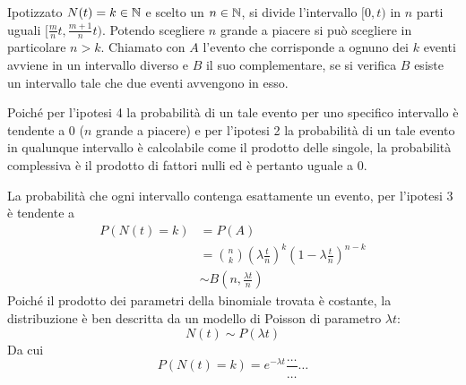 Ipotizzato $N(t)=k\in\mathbb N$ e scelto un $n\in\mathbb N$, si divide l'intervallo $[0,t)$ in $n$ parti uguali $[\frac{m}{n}t,\frac{m+1}{n}t)$. Potendo scegliere $n$ grande a piacere si può scegliere in particolare $n>k$. Chiamato con $A$ l'evento che corrisponde a ognuno dei $k$ eventi avviene in un intervallo diverso e $B$ il suo complementare, se si verifica $B$ esiste un intervallo tale che due eventi avvengono in esso.

Poiché per l'ipotesi 4 la probabilità di un tale evento per uno specifico intervallo è tendente a $0$ ($n$ grande a piacere) e per l'ipotesi 2 la probabilità di un tale evento in qualunque intervallo è calcolabile come il prodotto delle singole, la probabilità complessiva è il prodotto di fattori nulli ed è pertanto uguale a $0$.

La probabilità che ogni intervallo contenga esattamente un evento, per l'ipotesi 3 è tendente a
\begin{align*}
	P(N(t) = k) & = P(A)                                                                                 \\
	            & = \binom{n}{k}\left(\lambda\frac{t}{n}\right)^k\left(1-\lambda\frac{t}{n}\right)^{n-k} \\
	            & \sim B\left(n,\frac{\lambda t}{n}\right)
\end{align*}
Poiché il prodotto dei parametri della binomiale trovata è costante, la distribuzione è ben descritta da un modello di Poisson di parametro $\lambda t$:
\begin{equation*}
	N(t)\sim P(\lambda t)
\end{equation*}
Da cui
\begin{equation*}
	P(N(t)=k) = e^{-\lambda t}\frac{\dots}{\dots}\dots
\end{equation*}
